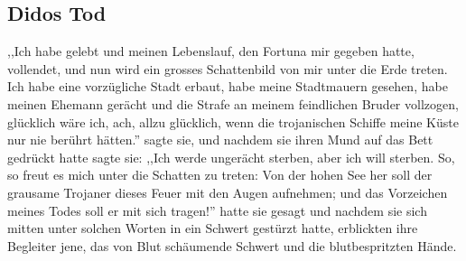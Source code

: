 \documentclass[a4paper]{article}
\begin{document}
\subsection{Didos Tod}
,,Ich habe gelebt und meinen Lebenslauf, den Fortuna mir gegeben hatte, vollendet, und nun wird ein grosses Schattenbild von mir unter die Erde treten. Ich habe eine vorzügliche Stadt erbaut, habe meine Stadtmauern gesehen, habe meinen Ehemann gerächt und die Strafe an meinem feindlichen Bruder vollzogen, glücklich wäre ich, ach, allzu glücklich, wenn die trojanischen Schiffe meine Küste nur nie berührt hätten.'' sagte sie, und nachdem sie ihren Mund auf das Bett gedrückt hatte sagte sie: ,,Ich werde ungerächt sterben, aber ich will sterben. So, so freut es mich unter die Schatten zu treten: Von der hohen See her soll der grausame Trojaner dieses Feuer mit den Augen aufnehmen; und das Vorzeichen meines Todes soll er mit sich tragen!'' hatte sie gesagt und nachdem sie sich mitten unter solchen Worten in ein Schwert gestürzt hatte, erblickten ihre Begleiter jene, das von Blut schäumende Schwert und die blutbespritzten Hände.
\end{document}
